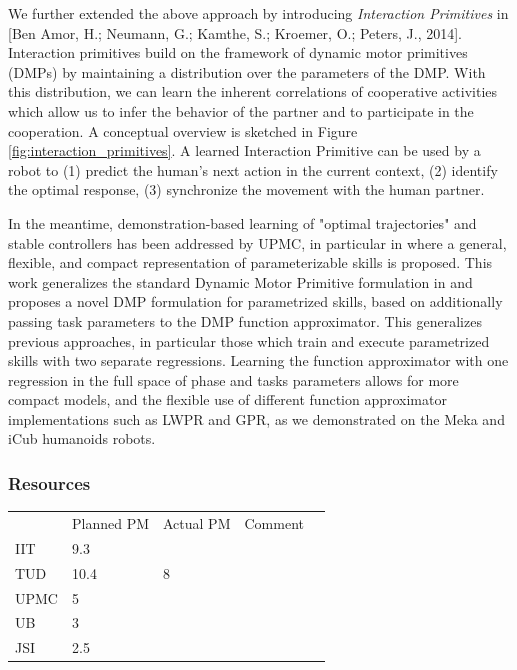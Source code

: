 \documentclass[12pt,a4paper,twoside]{article}
\begin{document}
We further extended the above approach by introducing \emph{Interaction Primitives} in [Ben Amor, H.; Neumann, G.; Kamthe, S.; Kroemer, O.; Peters, J., 2014]. Interaction primitives build on the framework of dynamic motor primitives (DMPs) by maintaining a distribution over the parameters of the DMP. With this distribution, we can learn the inherent correlations of cooperative activities which allow us to infer the behavior of the partner and to participate in the cooperation. A conceptual overview is sketched in Figure \ref{fig:interaction_primitives}. A learned Interaction Primitive can be used by a robot to (1) predict the human's next action in the current context, (2) identify the optimal response, (3) synchronize the movement with the human partner.

In the meantime, demonstration-based learning of "optimal trajectories" and stable controllers has been addressed by UPMC, in particular in \cite{stulp2013} where a general, flexible, and compact representation of parameterizable skills is proposed. This work generalizes the standard Dynamic Motor Primitive formulation in \cite{ijspeert2013} and proposes a novel DMP formulation for parametrized skills, based on additionally passing task parameters to the DMP function approximator. This generalizes previous approaches, in particular those which train and execute parametrized skills with two separate regressions. Learning the function approximator with one regression in the full space of phase and tasks parameters allows for more compact models, and the flexible use of different function approximator implementations such as LWPR and GPR, as we demonstrated on the Meka and iCub humanoids robots.


\subsubsection{Resources}

\begin{center}
\begin{tabular}{|l|l|l|l|l}
\cline{1-4}
 & Planned PM & Actual PM & Comment & \\ \cline{1-4}
IIT & 9.3 &  &  &  \\ \cline{1-4}
TUD & 10.4 & 8 &  &  \\ \cline{1-4}
UPMC & 5 &  &  &  \\ \cline{1-4}
UB & 3 &  &  &  \\ \cline{1-4}
JSI & 2.5 &  &  &  \\ \cline{1-4}
\end{tabular}
\end{center}
\end{document}
